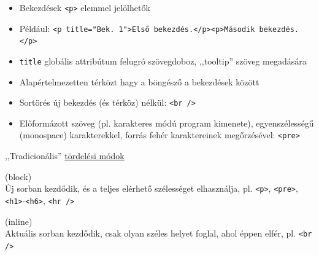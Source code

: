 \documentclass[usenames,dvipsnames,aspectratio=169]{beamer}
\newcommand{\hiv}[1]{{\color{hivatkozasszin}#1}}
\begin{document}
\begin{frame}
  \small
  \begin{itemize}
    \item Bekezdések \texttt{<p>} elemmel jelölhetők
    \item Például: \texttt{<p title="Bek. 1">Első bekezdés.</p><p>Második bekezdés.</p>}
    \item \texttt{title} globális attribútum felugró szövegdoboz, ,,tooltip'' szöveg megadására
    \item Alapértelmezetten térközt hagy a böngésző a bekezdések között
    \item Sortörés új bekezdés (és térköz) nélkül: \texttt{<br />}
    \item Előformázott szöveg (pl. karakteres módú program kimenete), egyenszélességű (monospace) karakterekkel, forrás fehér karaktereinek megőrzésével: \texttt{<pre>}
  \end{itemize}
  \vfill
  ,,Tradicionális'' \hiv{\href{https://developer.mozilla.org/en-US/docs/Web/HTML/Block-level_elements}{tördelési módok}}
  \begin{description}[m]
    \item[Blokkszintű] (block) \hfill \\ Új sorban kezdődik, és a teljes elérhető szélességet elhasználja, pl. \texttt{<p>}, \texttt{<pre>}, \texttt{<h1>}-\texttt{<h6>}, \texttt{<hr />}
    \item[Soron belüli] (inline) \hfill \\ Aktuális sorban kezdődik, csak olyan széles helyet foglal, ahol éppen elfér, pl. \texttt{<br />}
  \end{description}
\end{frame}
\end{document}
